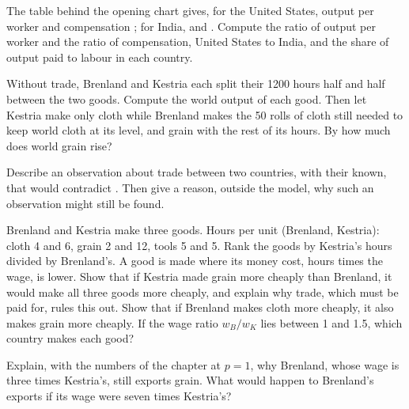\begin{exercise}[$\star\star$]\label{exo:g10:ricardo-model:10}
The table behind the opening chart gives, for the United States, output per worker  and
compensation ; for India,  and . Compute the ratio of output per worker and the
ratio of compensation, United States to India, and the share of output paid to labour in each country.
\end{exercise}

\begin{exercise}[$\star\star$]\label{exo:g10:ricardo-model:11}
Without trade, Brenland and Kestria each split their \num{1200} hours half and half between the two goods. Compute
the world output of each good. Then let Kestria make only cloth while Brenland makes the 50 rolls of cloth still
needed to keep world cloth at its  level, and grain with the rest of its hours. By how much does world
grain rise?
\end{exercise}

\begin{exercise}[$\star\star\star$]\label{exo:g10:ricardo-model:12}
Describe an observation about trade between two countries, with their  known, that would
contradict . Then give a reason, outside the model, why such an observation might still be found.
\end{exercise}

\begin{exercise}[$\star\star\star$]\label{exo:g10:ricardo-model:13}
Brenland and Kestria make three goods. Hours per unit (Brenland, Kestria): cloth 4 and 6, grain 2 and 12, tools 5
and 5. Rank the goods by Kestria's hours divided by Brenland's. A good is made where its money cost, hours times
the wage, is lower. Show that if Kestria made grain more cheaply than Brenland, it would make all three goods more
cheaply, and explain why trade, which must be paid for, rules this out. Show that if Brenland makes cloth more
cheaply, it also makes grain more cheaply. If the wage ratio $w_B/w_K$ lies between 1 and 1.5, which country makes
each good?
\end{exercise}

\begin{exercise}[$\star\star\star$]\label{exo:g10:ricardo-model:14}
Explain, with the numbers of the chapter at $p = 1$, why Brenland, whose wage is three times Kestria's, still
exports grain. What would happen to Brenland's exports if its wage were seven times Kestria's?
\end{exercise}

